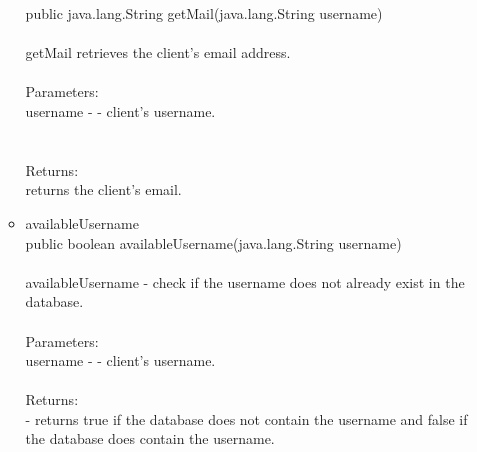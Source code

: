 \documentclass[letterpaper]{article}
\begin{document}
\begin{itemize}
\begin{itemize}
													public java.lang.String getMail(java.lang.String username) \\ \\
													getMail retrieves the client's email address. \\ \\
													Parameters: \\
													username - - client's username. \\ \\ \\
													Returns: \\
													returns the client's email.
											\item	availableUsername \\
													public boolean availableUsername(java.lang.String username) \\ \\
													availableUsername - check if the username does not already exist in the database. \\ \\
													Parameters: \\
													username - - client's username. \\ \\
													Returns: \\
													- returns true if the database does not contain the username and false if the database does contain the username.
										\end{itemize}
							\end{itemize}
							
						\vspace{0.2in}
\end{document}
